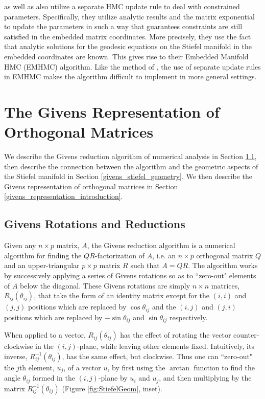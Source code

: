 \documentclass[ba]{imsart}
\numberwithin{equation}{section}
\theoremstyle{plain}
\begin{document}
\noindent \citet{byrne2013geodesic} as well as \citet{holbrook2016bayesian} also utilize a separate HMC update rule to deal with constrained parameters. Specifically, they utilize analytic results and the matrix exponential to update the parameters in such a way that guarantees constraints are still satisfied in the embedded matrix coordinates. More precisely, they use the fact that analytic solutions for the geodesic equations on the Stiefel manifold in the embedded coordinates are known. This gives rise to their Embedded Manifold HMC (EMHMC) algorithm. Like the method of \cite{brubaker2012family}, the use of separate update rules in EMHMC makes the algorithm difficult to implement in more general settings.

\section{The Givens Representation of Orthogonal Matrices} \label{Givens}
We describe the Givens reduction algorithm of numerical analysis in Section \ref{givens_reduction}, then describe the connection between the algorithm and the geometric aspects of the Stiefel manifold in Section \ref{givens_stiefel_geometry}. We then describe the Givens representation of orthogonal matrices in Section \ref{givens_representation_introduction}.

\subsection{Givens Rotations and Reductions} \label{givens_reduction}
Given any $n \times p$ matrix, $A$, the Givens reduction algorithm is a numerical algorithm for finding the $QR$-factorization of $A$, i.e. an $n\times p$ orthogonal matrix $Q$ and an upper-triangular $p \times p$ matrix $R$ such that $A = QR$. The algorithm works by successively applying a series of Givens rotations so as to ``zero-out" elements of $A$ below the diagonal. These Givens rotations are simply $n \times n$ matrices, $R_{ij}(\theta_{ij})$, that take the form of an identity matrix except for the $(i,i)$ and $(j,j)$ positions which are replaced by $\cos \theta_{ij}$ and the $(i,j)$ and $(j,i)$ positions which are replaced by $-\sin \theta_{ij}$ and $\sin \theta_{ij}$ respectively.

\noindent When applied to a vector, $R_{ij}(\theta_{ij})$ has the effect of rotating the vector counter-clockwise in the $(i,j)$-plane, while leaving other elements fixed. Intuitively, its inverse, $R_{ij}^{-1}(\theta_{ij})$, has the same effect, but clockwise. Thus one can ``zero-out" the $j$th element, $u_j$, of a vector $u$, by first using the $\arctan$ function to find the angle $\theta_{ij}$ formed in the $(i,j)$-plane by $u_i$ and $u_j$, and then multiplying by the matrix $R_{ij}^{-1}(\theta_{ij})$ (Figure \ref{fig:StiefelGeom}, inset).
\end{document}
